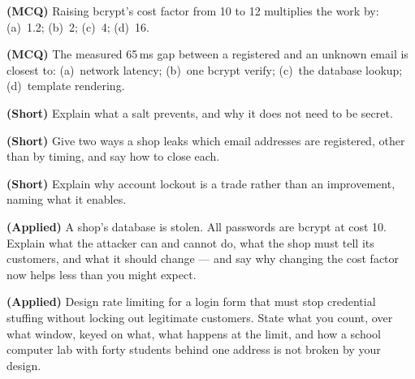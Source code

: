 \begin{reviewq}
  \item \textbf{(MCQ)} Raising bcrypt's cost factor from 10 to 12 multiplies
        the work by: (a)~1.2; (b)~2; (c)~4; (d)~16.
  \item \textbf{(MCQ)} The measured 65\,ms gap between a registered and an
        unknown email is closest to: (a)~network latency; (b)~one bcrypt
        verify; (c)~the database lookup; (d)~template rendering.
  \item \textbf{(Short)} Explain what a salt prevents, and why it does not need
        to be secret.
  \item \textbf{(Short)} Give two ways a shop leaks which email addresses are
        registered, other than by timing, and say how to close each.
  \item \textbf{(Short)} Explain why account lockout is a trade rather than an
        improvement, naming what it enables.
  \item \textbf{(Applied)} A shop's database is stolen. All passwords are
        bcrypt at cost 10. Explain what the attacker can and cannot do, what
        the shop must tell its customers, and what it should change --- and
        say why changing the cost factor now helps less than you might expect.
  \item \textbf{(Applied)} Design rate limiting for a login form that must stop
        credential stuffing without locking out legitimate customers. State
        what you count, over what window, keyed on what, what happens at the
        limit, and how a school computer lab with forty students behind one
        address is not broken by your design.
\end{reviewq}
